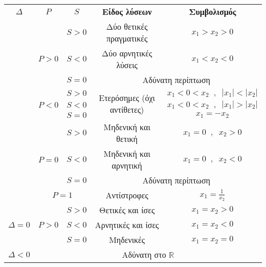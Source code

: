 \begin{longtable}{c|c|c|cc}
\hline \rule[-2ex]{0pt}{5.5ex} \boldmath$\varDelta$ & \boldmath$P$ & \boldmath$S$ & \textbf{Είδος λύσεων} & \textbf{Συμβολισμός}\\ 
\hhline{=====} \rule[-2ex]{0pt}{5.5ex}  &  & $ S>0 $ & Δύο θετικές πραγματικές & $ x_1>x_2>0 $ \\ 
\hhline{~|~-~~} \multirow{15}{*}{$ \varDelta>0 $}  & $ P>0 $ & $ S<0 $ & Δύο αρνητικές λύσεις & $ x_1<x_2<0 $ \rule[-2ex]{0pt}{5.5ex}\\ 
\hhline{~|~-~~}   &  & $ S=0 $ & \multicolumn{2}{c}{Αδύνατη περίπτωση}  \rule[-2ex]{0pt}{5.5ex}\\ 
\hhline{~|----}   &  & $ S>0 $ & \multirow{3}{*}{Ετερόσημες (όχι αντίθετες)} & $ x_1<0<x_2\;\;,\;\;|x_1|<|x_2| $ \rule[-2ex]{0pt}{5.5ex}\\ 
\hhline{~|~-~~} \rule[-2ex]{0pt}{5.5ex}  & $ P<0 $ & $ S<0 $ &  & $ x_1<0<x_2\;\;,\;\;|x_1|>|x_2| $ \\ 
\hhline{~|~-~~} \rule[-2ex]{0pt}{5.5ex}  &  & $ S=0 $ & Αντίθετες  & $ x_1=-x_2 $ \\ 
\hhline{~|----} \rule[-2ex]{0pt}{5.5ex}  &  & $ S>0 $ & Μηδενική και θετική & $ x_1=0\;\;,\;\;x_2>0 $ \\ 
\hhline{~|~-~~} \rule[-2ex]{0pt}{5.5ex}  & $ P=0 $ & $ S<0 $ & Μηδενική και αρνητική & $ x_1=0\;\;,\;\;x_2<0 $ \\ 
\hhline{~|~-~~} \rule[-2ex]{0pt}{5.5ex}  &  & $ S=0 $ &  \multicolumn{2}{c}{Αδύνατη περίπτωση}  \\ 
\hhline{~|----} \rule[-2ex]{0pt}{5.5ex}  & \multicolumn{2}{c|}{$ P=1 $} & Αντίστροφες & $ x_1=\frac{1}{x_2} $  \\ 
\hhline{-----}   & \multirow{3}{*}{$ P>0 $} & $ S>0 $ & Θετικές και ίσες  & $ x_1=x_2>0 $ \rule[-2ex]{0pt}{5.5ex}\\ 
\hhline{~|~|-|~~} \rule[-2ex]{0pt}{5.5ex} $ \varDelta=0 $ &  & $ S<0 $ & Αρνητικές και ίσες & $ x_1=x_2<0 $ \\ 
\hhline{~|--|~~} \rule[-2ex]{0pt}{5.5ex}  & $ P=0 $ & $ S=0 $ & Μηδενικές & $ x_1=x_2=0 $ \\ 
\hhline{-----} \rule[-2ex]{0pt}{5.5ex} $ \varDelta<0 $ & \multicolumn{4}{c}{Αδύνατη στο $ \mathbb{R} $}  \\ 
\hline 
\end{longtable}
